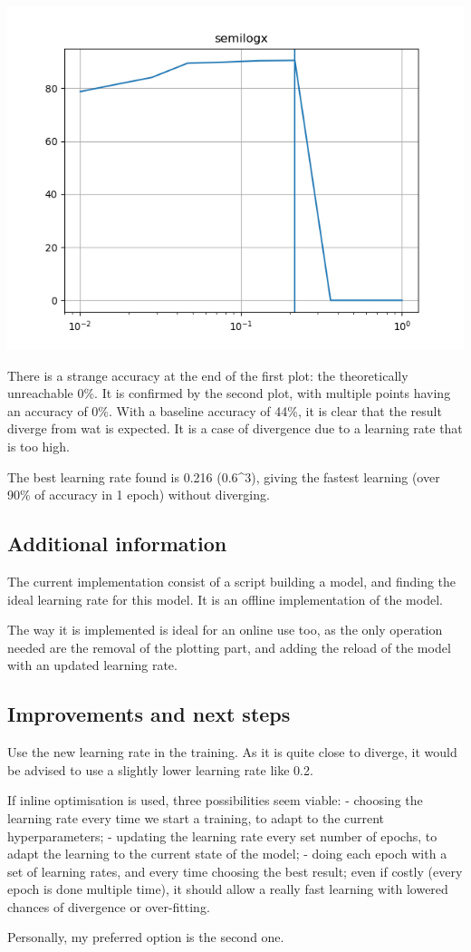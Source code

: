 \includegraphics{parts/appendix/reports-papud/2018_07_23-Learning_rate_optimisation/lr_epoch_1_mul_0_6_best_0_216.png}

There is a strange accuracy at the end of the first plot: the
theoretically unreachable 0\%. It is confirmed by the second plot, with
multiple points having an accuracy of 0\%. With a baseline accuracy of
44\%, it is clear that the result diverge from wat is expected. It is a
case of divergence due to a learning rate that is too high.

The best learning rate found is 0.216 (0.6\^{}3), giving the fastest
learning (over 90\% of accuracy in 1 epoch) without diverging.

\subsection{Additional information}

The current implementation consist of a script building a model, and
finding the ideal learning rate for this model. It is an offline
implementation of the model.

The way it is implemented is ideal for an online use too, as the only
operation needed are the removal of the plotting part, and adding the
reload of the model with an updated learning rate.

\subsection{Improvements and next
steps}

Use the new learning rate in the training. As it is quite close to
diverge, it would be advised to use a slightly lower learning rate like
0.2.

If inline optimisation is used, three possibilities seem viable: -
choosing the learning rate every time we start a training, to adapt to
the current hyperparameters; - updating the learning rate every set
number of epochs, to adapt the learning to the current state of the
model; - doing each epoch with a set of learning rates, and every time
choosing the best result; even if costly (every epoch is done multiple
time), it should allow a really fast learning with lowered chances of
divergence or over-fitting.

Personally, my preferred option is the second one.
